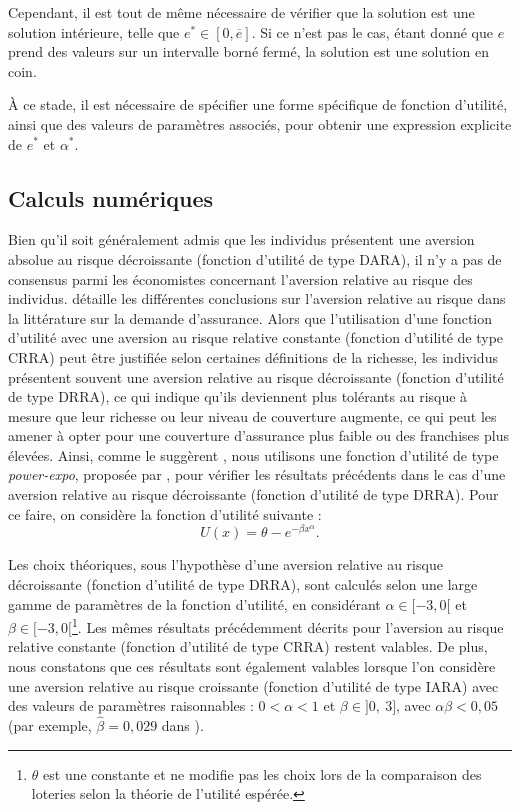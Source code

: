 \begin{Article}
\begin{refsection}[Mouminoux]
\begin{appendices}
Cependant, il est tout de même nécessaire de vérifier que la solution est une solution intérieure, telle que $e^* \in [0, \overline{e}]$. Si ce n'est pas le cas, étant donné que $e$ prend des valeurs sur un intervalle borné fermé, la solution est une solution en coin.

À ce stade, il est nécessaire de spécifier une forme spécifique de fonction d'utilité, ainsi que des valeurs de paramètres associés, pour obtenir une expression explicite de $e^*$ et $\alpha^*$.


\subsection{Calculs numériques}
\label{Annexe:Expected_results_num}

Bien qu'il soit généralement admis que les individus présentent une aversion absolue au risque décroissante (fonction d'utilité de type DARA), il n'y a pas de consensus parmi les économistes concernant l'aversion relative au risque des individus. \textcite{o14} détaille les différentes conclusions sur l'aversion relative au risque dans la littérature sur la demande d'assurance. Alors que l'utilisation d'une fonction d'utilité avec une aversion au risque relative constante (fonction d'utilité de type CRRA) peut être justifiée selon certaines définitions de la richesse, les individus présentent souvent une aversion relative au risque décroissante (fonction d'utilité de type DRRA), ce qui indique qu'ils deviennent plus tolérants au risque à mesure que leur richesse ou leur niveau de couverture augmente, ce qui peut les amener à opter pour une couverture d'assurance plus faible ou des franchises plus élevées. Ainsi, comme le suggèrent \textcite{hl02}, nous utilisons une fonction d'utilité de type \og\textit{power-expo}\fg, proposée par \textcite{s93}, pour vérifier les résultats précédents dans le cas d'une aversion relative au risque décroissante (fonction d'utilité de type DRRA). Pour ce faire, on considère la fonction d'utilité suivante :
\begin{equation}
U(x) = \theta -e^{-\beta x^\alpha}.
\end{equation}

Les choix théoriques, sous l'hypothèse d'une aversion relative au risque décroissante (fonction d'utilité de type DRRA), sont calculés selon une large gamme de paramètres de la fonction d'utilité, en considérant $\alpha \in [-3,0[$ et $\beta \in [-3,0[$\footnote{$\theta$ est une constante et ne modifie pas les choix lors de la comparaison des loteries selon la théorie de l'utilité espérée.}. Les mêmes résultats précédemment décrits pour l'aversion au risque relative constante (fonction d'utilité de type CRRA) restent valables. De plus, nous constatons que ces résultats sont également valables lorsque l'on considère une aversion relative au risque croissante (fonction d'utilité de type IARA) avec des valeurs de paramètres raisonnables : $0 < \alpha < 1$ et $\beta \in ]0,~3]$, avec $\alpha\beta<0,05$ (par exemple, $\hat{\beta}=0,029$ dans \textcite{hl02}).


\end{appendices}
\end{refsection}
\end{Article}
